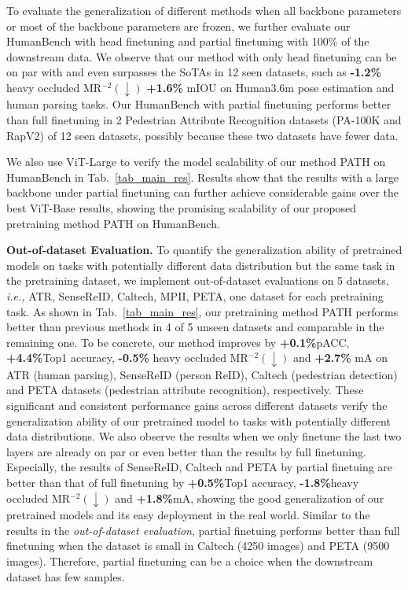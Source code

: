 \documentclass[10pt,twocolumn,letterpaper]{article}
\begin{document}
To evaluate the generalization of different methods when all backbone parameters or most of the backbone parameters are frozen, we further evaluate our HumanBench with head finetuning and partial finetuning with 100\% of the downstream data. We observe that our method with only head finetuning can be on par with and even surpasses the SoTAs in 12 seen datasets, such as \textbf{-1.2\%} heavy occluded MR$^{-2}$$(\downarrow)$ \textbf{+1.6\%} mIOU on Human3.6m pose estimation and human parsing tasks. Our HumanBench with partial finetuning performs better than full finetuning in 2 Pedestrian Attribute Recognition datasets (PA-100K and RapV2) of 12 seen datasets, possibly because these two datasets have fewer data. 


We also use ViT-Large to verify the model scalability of our method PATH on HumanBench in Tab.~\ref{tab_main_res}. Results show that the results with a large backbone under partial finetuning can further achieve considerable gains over the best ViT-Base results, showing the promising scalability of our proposed pretraining method PATH on HumanBench.















\noindent \textbf{Out-of-dataset Evaluation.}
To quantify the generalization ability of  pretrained models on tasks with potentially different data distribution but the same task in the pretraining dataset, we implement out-of-dataset evaluations on 5 datasets, \emph{i.e.,} ATR, SenseReID, Caltech, MPII, PETA, one dataset for each pretraining task. As shown in Tab.~\ref{tab_main_res}, our pretraining method PATH performs better than previous methods in 4 of 5 unseen datasets and comparable in the remaining one. To be concrete, our method improves by \textbf{+0.1\%}pACC, \textbf{+4.4\%}Top1 accuracy, \textbf{-0.5\%} heavy occluded MR$^{-2}$$(\downarrow)$ and \textbf{+2.7\%} mA on ATR (human parsing), SenseReID (person ReID), Caltech (pedestrian detection) and PETA datasets (pedestrian attribute recognition), respectively.
These significant and consistent performance gains across different datasets verify the generalization ability of our pretrained model to tasks with potentially different data distributions. We also observe the results when we only finetune the last two layers are already on par or even better than the results by full finetuning. Especially, the results of SenseReID, Caltech and PETA by partial finetuing are better than that of full finetuning by \textbf{+0.5\%}Top1 accuracy, \textbf{-1.8\%}heavy occluded MR$^{-2}$$(\downarrow)$ and \textbf{+1.8\%}mA, showing the good generalization of our pretrained models and its easy deployment in the real world. Similar to the results in the \emph{out-of-dataset evaluation}, partial finetuing performs better than full finetuning when the dataset is small in Caltech (4250 images) and PETA (9500 images). Therefore, partial finetuning can be a choice when the downstream dataset has few samples.
\end{document}
